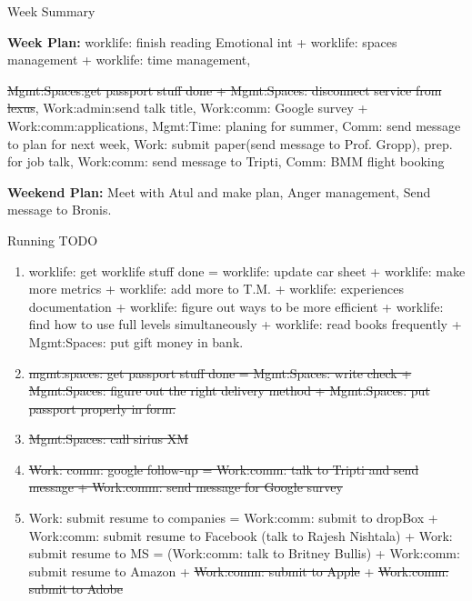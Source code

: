 \documentclass[serif, mathserif, final]{beamer}
\newcommand{\doneTaskNoItem}[1]{\sout{#1}}
\newcommand{\doneTask}[1]{\tiny \item \tiny \sout{#1}}
\begin{document}
\begin{frame}{}
\begin{columns}
\begin{column}{0.50\linewidth}
\begin{block}{Week Summary}
        {\tiny \textbf{Week Plan:} worklife: finish reading Emotional
          int + worklife: spaces management + worklife: time
          management, \doneTask{Mgmt:Spaces:get passport stuff done +
            Mgmt:Spaces: disconnect service from lexus}, Work:admin:send
          talk title, Work:comm: Google survey +
          Work:comm:applications, Mgmt:Time: planing for summer,
          Comm: send message to plan for next week, Work: submit
          paper(send message to Prof. Gropp),
          prep. for job talk, Work:comm:
          send message to Tripti, Comm: BMM flight booking}

{\tiny \textbf{Weekend Plan:}  Meet with Atul and make plan,  Anger
  management, Send message to Bronis. } 
      \end{block} 
      
      \begin{block}{Running TODO} %
        \begin{enumerate} 

        \item \small worklife: get worklife stuff done =  worklife:
          update car sheet + worklife: make more metrics + worklife:
          add more to T.M. + worklife: experiences documentation +
          worklife: figure out ways to be more efficient + worklife:
          find how to use full levels simultaneously + worklife: read
          books frequently + Mgmt:Spaces: put gift money in bank.  

        \doneTask{mgmt:spaces: get passport stuff done =
          Mgmt:Spaces: write check  + Mgmt:Spaces: figure out the
          right delivery method + Mgmt:Spaces: put passport properly
          in form.} 

        \doneTask{Mgmt:Spaces: call sirius XM}       
        \doneTask{ Work: comm: google follow-up = Work:comm: talk to
          Tripti and send message + Work:comm: send message for Google
          survey }

      \item \small Work: submit resume to companies  = Work:comm:
        submit to dropBox + Work:comm: submit
        resume to Facebook (talk to Rajesh Nishtala) + Work: submit
        resume to MS = (Work:comm: talk to Britney Bullis) +
        Work:comm: submit resume to Amazon + 
        \doneTaskNoItem{Work:comm: submit to Apple} +
        \doneTaskNoItem{Work:comm: submit to Adobe} 
       


\end{enumerate}
\end{block}
\end{column}
\end{columns}
\end{frame}
\end{document}

